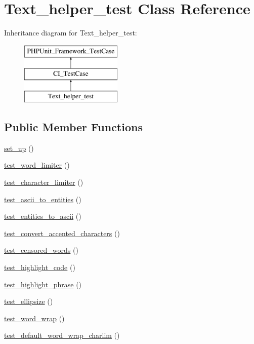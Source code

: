 \hypertarget{class_text__helper__test}{}\section{Text\+\_\+helper\+\_\+test Class Reference}
\label{class_text__helper__test}
Inheritance diagram for Text\+\_\+helper\+\_\+test\+:\begin{figure}[H]
\begin{center}
\leavevmode
\includegraphics[height=3.000000cm]{class_text__helper__test}
\end{center}
\end{figure}
\subsection*{Public Member Functions}
\begin{DoxyCompactItemize}
\item 
\hyperlink{class_text__helper__test_a69829875c8d4b6ce94908445c4155741}{set\+\_\+up} ()
\item 
\hyperlink{class_text__helper__test_aa0b698536cb6eb92e86f71beead412dc}{test\+\_\+word\+\_\+limiter} ()
\item 
\hyperlink{class_text__helper__test_a95babe89d14ce4284bafe785140a6843}{test\+\_\+character\+\_\+limiter} ()
\item 
\hyperlink{class_text__helper__test_a2268e96f201a864e0d7491704f5719e2}{test\+\_\+ascii\+\_\+to\+\_\+entities} ()
\item 
\hyperlink{class_text__helper__test_aa03eb81346667a21be9103e890396b36}{test\+\_\+entities\+\_\+to\+\_\+ascii} ()
\item 
\hyperlink{class_text__helper__test_a2f95a8974fba30beece8f3953e29152d}{test\+\_\+convert\+\_\+accented\+\_\+characters} ()
\item 
\hyperlink{class_text__helper__test_a30e1871a6c9c513614b1c69bb3659b4a}{test\+\_\+censored\+\_\+words} ()
\item 
\hyperlink{class_text__helper__test_ab1df41bcb810ab5abace87b9f07496cc}{test\+\_\+highlight\+\_\+code} ()
\item 
\hyperlink{class_text__helper__test_a13aa5e6c384de49b34251a53b7dd7ba7}{test\+\_\+highlight\+\_\+phrase} ()
\item 
\hyperlink{class_text__helper__test_a27e1f92494edc4c68cb429057e17458a}{test\+\_\+ellipsize} ()
\item 
\hyperlink{class_text__helper__test_aa4a34c99b975681b73c667333d32cf01}{test\+\_\+word\+\_\+wrap} ()
\item 
\hyperlink{class_text__helper__test_a7980458fe7791b6cbf17cc551e1ef6da}{test\+\_\+default\+\_\+word\+\_\+wrap\+\_\+charlim} ()
\end{DoxyCompactItemize}
